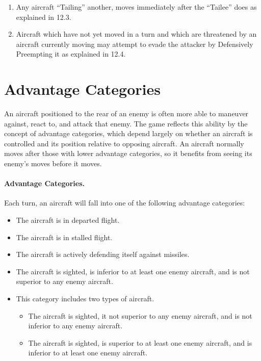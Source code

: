 {\begin{enumerate}
    \item{} Any aircraft “Tailing” another, moves immediately after the “Tailee” does as explained in  12.3.

    \item{} Aircraft which have not yet moved in a turn and which are threatened by an aircraft currently moving may attempt to evade the attacker by Defensively Preempting it as explained in 12.4.
    
\end{enumerate}

}{

\section{Advantage Categories}
\label{rule:positions-of-advantage}

An aircraft positioned to the rear of an enemy is often more able to maneuver against, react to, and attack that enemy. The game reflects this ability by the concept of advantage categories, which depend largely on whether an aircraft is controlled and its position relative to opposing aircraft. An aircraft normally moves after those with lower advantage categories, so it benefits from seeing its enemy’s moves before it moves.

\paragraph{Advantage Categories.} Each turn, an aircraft will fall into one of the following advantage categories:

\begin{itemize}

    \item{} The aircraft is in departed flight.

    \item{} The aircraft is in stalled flight.

    \item{} The aircraft is actively defending itself against missiles.

    \item{} 
    The aircraft is sighted, is inferior to at least one enemy aircraft, and is not superior to any enemy aircraft.
    
    \item{} This category includes two types of aircraft. 
    \begin{itemize}
        \item The aircraft is sighted, it not superior to any enemy aircraft, and is not inferior to any enemy aircraft.
        \item The aircraft is sighted, is superior to at least one enemy aircraft, and is inferior to at least one enemy aircraft.
    \end{itemize}


\end{itemize}}
